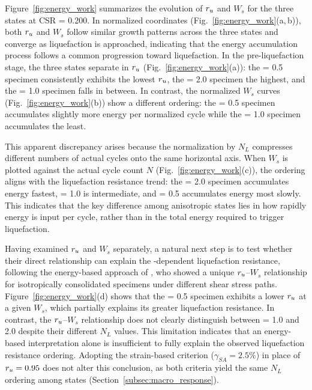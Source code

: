 Figure~\ref{fig:energy_work} summarizes the evolution of $r_u$ and $W_s$ for the three \Kzero{} states at CSR = 0.200. In normalized coordinates (Fig.~\ref{fig:energy_work}(a,\,b)), both $r_u$ and $W_s$ follow similar growth patterns across the three \Kzero{} states and converge as liquefaction is approached, indicating that the energy accumulation process follows a common progression toward liquefaction. In the pre-liquefaction stage, the three states separate in $r_u$ (Fig.~\ref{fig:energy_work}(a)): the \Kzero{} = 0.5 specimen consistently exhibits the lowest $r_u$, the \Kzero{} = 2.0 specimen the highest, and the \Kzero{} = 1.0 specimen falls in between. In contrast, the normalized $W_s$ curves (Fig.~\ref{fig:energy_work}(b)) show a different ordering: the \Kzero{} = 0.5 specimen accumulates slightly more energy per normalized cycle while the \Kzero{} = 1.0 specimen accumulates the least.

This apparent discrepancy arises because the normalization by $N_L$ compresses different numbers of actual cycles onto the same horizontal axis. When $W_s$ is plotted against the actual cycle count $N$ (Fig.~\ref{fig:energy_work}(c)), the ordering aligns with the liquefaction resistance trend: the \Kzero{} = 2.0 specimen accumulates energy fastest, \Kzero{} = 1.0 is intermediate, and \Kzero{} = 0.5 accumulates energy most slowly. This indicates that the key difference among anisotropic states lies in how rapidly energy is input per cycle, rather than in the total energy required to trigger liquefaction.

Having examined $r_u$ and $W_s$ separately, a natural next step is to test whether their direct relationship can explain the \Kzero{}-dependent liquefaction resistance, following the energy-based approach of \citet{TowhataIshihara1985}, who showed a unique $r_u$--$W_s$ relationship for isotropically consolidated specimens under different shear stress paths. Figure~\ref{fig:energy_work}(d) shows that the \Kzero{} = 0.5 specimen exhibits a lower $r_u$ at a given $W_s$, which partially explains its greater liquefaction resistance. In contrast, the $r_u$--$W_s$ relationship does not clearly distinguish between \Kzero{} = 1.0 and 2.0 despite their different $N_L$ values. This limitation indicates that an energy-based interpretation alone is insufficient to fully explain the observed liquefaction resistance ordering. Adopting the strain-based criterion ($\gamma_{SA}=2.5\%$) in place of $r_u=0.95$ does not alter this conclusion, as both criteria yield the same $N_L$ ordering among \Kzero{} states (Section~\ref{subsec:macro_response}).


